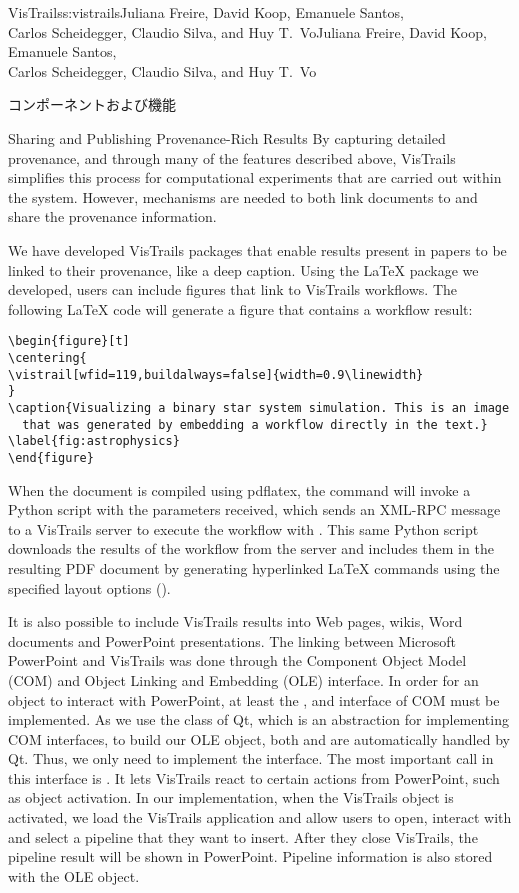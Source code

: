 \begin{aosachaptertoc}{VisTrails}{s:vistrails}{Juliana Freire, David Koop, Emanuele Santos, \\ Carlos Scheidegger, Claudio Silva, and Huy T.\ Vo}{Juliana Freire, David Koop, Emanuele Santos, \\ \hspace*{0.9cm} Carlos Scheidegger, Claudio Silva, and Huy T.\ Vo}
\begin{aosasect1}{コンポーネントおよび機能}
\begin{aosasect2}{Sharing and Publishing Provenance-Rich Results}
By capturing detailed provenance, and through many of the features
described above, VisTrails simplifies this process for computational
experiments that are carried out within the system. However,
mechanisms are needed to both link documents to and share the
provenance information.

We have developed VisTrails packages that enable results present in
papers to be linked to their provenance, like a deep caption. Using
the LaTeX package we developed, users can include figures that link to
VisTrails workflows.  The following LaTeX code will generate a figure
that contains a workflow result:

\begin{verbatim}
\begin{figure}[t]
\centering{
\vistrail[wfid=119,buildalways=false]{width=0.9\linewidth}
}
\caption{Visualizing a binary star system simulation. This is an image
  that was generated by embedding a workflow directly in the text.}
\label{fig:astrophysics}
\end{figure}
\end{verbatim}

When the document is compiled using pdflatex, the
 command will invoke a Python script
with the parameters received, which sends an XML-RPC message to a
VisTrails server to execute the workflow with . This same
Python script downloads the results of the workflow from the server
and includes them in the resulting PDF document by generating
hyperlinked LaTeX  commands
using the specified layout options
().

It is also possible to include VisTrails results into Web pages,
wikis, Word documents and PowerPoint presentations. The linking
between Microsoft PowerPoint and VisTrails was done through the
Component Object Model (COM) and Object Linking and Embedding (OLE)
interface. In order for an object to interact with PowerPoint, at
least the ,  and
 interface of COM must be implemented. As we use
the  class of Qt, which is an abstraction for
implementing COM interfaces, to build our OLE object, both
 and  are automatically
handled by Qt. Thus, we only need to implement the 
interface. The most important call in this interface is
. It lets VisTrails react to certain actions from
PowerPoint, such as object activation. In our implementation, when the
VisTrails object is activated, we load the VisTrails application and
allow users to open, interact with and select a pipeline that they
want to insert. After they close VisTrails, the pipeline result will
be shown in PowerPoint. Pipeline information is also stored with the
OLE object.


\end{aosasect2}
\end{aosasect1}
\end{aosachaptertoc}
